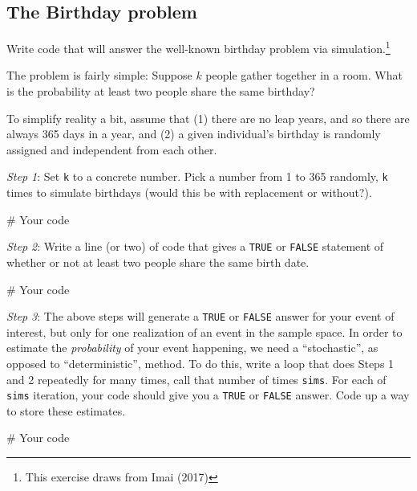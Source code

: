 \documentclass[
  letterpaper,
]{book}
\newenvironment{Shaded}{\begin{snugshade}}{\end{snugshade}}
\newcommand{\CommentTok}[1]{\textcolor[rgb]{0.37,0.37,0.37}{#1}}
\theoremstyle{definition}
\theoremstyle{definition}
\theoremstyle{plain}
\theoremstyle{definition}
\theoremstyle{plain}
\theoremstyle{plain}
\theoremstyle{remark}
\begin{document}
\hypertarget{the-birthday-problem}{%
\subsection*{The Birthday problem}\label{the-birthday-problem}}

Write code that will answer the well-known birthday problem via
simulation.\footnote{This exercise draws from Imai (2017)}

The problem is fairly simple: Suppose \(k\) people gather together in a
room. What is the probability at least two people share the same
birthday?

To simplify reality a bit, assume that (1) there are no leap years, and
so there are always 365 days in a year, and (2) a given individual's
birthday is randomly assigned and independent from each other.

\emph{Step 1}: Set \texttt{k} to a concrete number. Pick a number from 1
to 365 randomly, \texttt{k} times to simulate birthdays (would this be
with replacement or without?).

\begin{Shaded}
\begin{Highlighting}[]
\CommentTok{\# Your code}
\end{Highlighting}
\end{Shaded}

\emph{Step 2}: Write a line (or two) of code that gives a \texttt{TRUE}
or \texttt{FALSE} statement of whether or not at least two people share
the same birth date.

\begin{Shaded}
\begin{Highlighting}[]
\CommentTok{\# Your code}
\end{Highlighting}
\end{Shaded}

\emph{Step 3}: The above steps will generate a \texttt{TRUE} or
\texttt{FALSE} answer for your event of interest, but only for one
realization of an event in the sample space. In order to estimate the
\emph{probability} of your event happening, we need a ``stochastic'', as
opposed to ``deterministic'', method. To do this, write a loop that does
Steps 1 and 2 repeatedly for many times, call that number of times
\texttt{sims}. For each of \texttt{sims} iteration, your code should
give you a \texttt{TRUE} or \texttt{FALSE} answer. Code up a way to
store these estimates.

\begin{Shaded}
\begin{Highlighting}[]
\CommentTok{\# Your code}
\end{Highlighting}
\end{Shaded}
\end{document}
